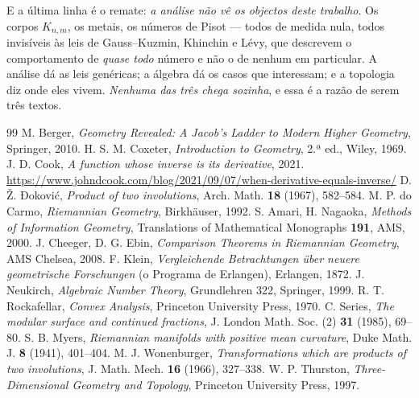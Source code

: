\documentclass[livro.tex]{subfiles}
\begin{document}
\noindent E a última linha é o remate: \emph{a análise não vê os objectos deste trabalho}. Os
corpos $K_{n,m}$, os metais, os números de Pisot --- todos de medida nula, todos invisíveis às leis
de Gauss--Kuzmin, Khinchin e Lévy, que descrevem o comportamento de \emph{quase todo} número e não
o de nenhum em particular. A análise dá as leis genéricas; a álgebra dá os casos que interessam; e
a topologia diz onde eles vivem. \emph{Nenhuma das três chega sozinha}, e essa é a razão de serem
três textos.



\begin{thebibliography}{99}
 M. Berger, \emph{Geometry Revealed: A Jacob's Ladder to Modern Higher
Geometry}, Springer, 2010.
 H. S. M. Coxeter, \emph{Introduction to Geometry}, 2.ª ed., Wiley, 1969.
 J. D. Cook, \emph{A function whose inverse is its derivative}, 2021.
\url{https://www.johndcook.com/blog/2021/09/07/when-derivative-equals-inverse/}
 D. Ž. Đoković, \emph{Product of two involutions},
Arch. Math. \textbf{18} (1967), 582--584.
 M. P. do Carmo, \emph{Riemannian Geometry}, Birkhäuser, 1992.
 S. Amari, H. Nagaoka, \emph{Methods of Information Geometry},
Translations of Mathematical Monographs \textbf{191}, AMS, 2000.
 J. Cheeger, D. G. Ebin, \emph{Comparison Theorems in Riemannian
Geometry}, AMS Chelsea, 2008.
 F. Klein, \emph{Vergleichende Betrachtungen über neuere geometrische
Forschungen} (o Programa de Erlangen), Erlangen, 1872.
 J. Neukirch, \emph{Algebraic Number Theory}, Grundlehren 322, Springer, 1999.
 R. T. Rockafellar, \emph{Convex Analysis}, Princeton University
Press, 1970.
 C. Series, \emph{The modular surface and continued fractions},
J. London Math. Soc. (2) \textbf{31} (1985), 69--80.
 S. B. Myers, \emph{Riemannian manifolds with positive mean curvature},
Duke Math. J. \textbf{8} (1941), 401--404.
 M. J. Wonenburger, \emph{Transformations which are products of two
involutions}, J. Math. Mech. \textbf{16} (1966), 327--338.
 W. P. Thurston, \emph{Three-Dimensional Geometry and Topology},
Princeton University Press, 1997.
\end{thebibliography}



%
%
\end{document}
